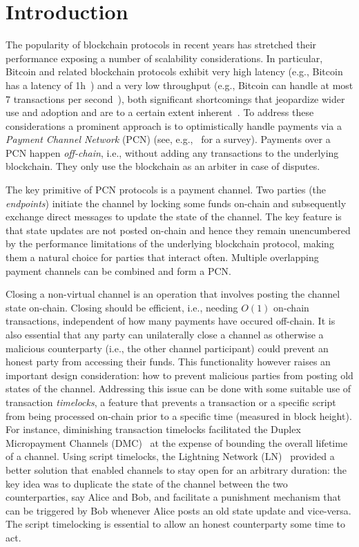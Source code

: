 \section{Introduction}
  The popularity of blockchain protocols in recent years has stretched their
  performance exposing a number of scalability considerations. In particular,
  Bitcoin and related blockchain protocols exhibit very high latency (e.g.,
  Bitcoin has a latency of 1h~\cite{bitcoin}) and a very low throughput (e.g.,
  Bitcoin can handle at most 7 transactions per second~\cite{scaling}), both
  significant shortcomings that jeopardize wider use and adoption and are to a
  certain extent inherent~\cite{scaling}. To address these considerations a
  prominent approach is to optimistically handle payments via a \emph{Payment
  Channel Network} (PCN) (see, e.g.,~\cite{DBLP:conf/fc/GudgeonMRMG20} for a
  survey). Payments over a PCN happen \emph{off-chain}, i.e., without adding any
  transactions to the underlying blockchain. They only use the blockchain as an
  arbiter in case of disputes.

The key primitive of PCN protocols is a payment channel. Two parties (the
\emph{endpoints}) initiate
the channel by locking some funds on-chain and subsequently exchange direct
messages to update the state of the channel. The key feature is that state
updates are not posted on-chain and hence they remain unencumbered by the
performance limitations of the underlying blockchain protocol, making them a
natural choice for parties that interact often. Multiple overlapping payment
channels can be combined and form a PCN.

Closing a non-virtual channel is an operation that involves posting the channel state
on-chain. Closing should be efficient, i.e., needing $O(1)$ on-chain
transactions, independent of how many payments have occured off-chain.
It is also essential that any party can unilaterally close a channel as
otherwise a malicious counterparty (i.e., the other channel participant) could
prevent an honest party from accessing their funds. This functionality however
raises an important design consideration: how to prevent malicious parties from
posting old states of the channel.
%
Addressing this issue can be done with some suitable use of transaction
\emph{timelocks}, a feature that prevents a transaction or a specific script from
being processed on-chain prior to a specific time (measured in block height).
%
For instance, diminishing transaction timelocks facilitated the Duplex
Micropayment Channels (DMC)~\cite{decker} at the expense of bounding the overall
lifetime of a channel. Using script timelocks, the Lightning Network
(LN)~\cite{lightning} provided a better solution that enabled channels to stay
open for an arbitrary duration: the key idea was to duplicate the state of the
channel between the two counterparties, say Alice and Bob, and facilitate a
punishment mechanism that can be triggered by Bob whenever Alice posts an old
state update and vice-versa. The script timelocking is essential to allow an
honest counterparty some time to act.

